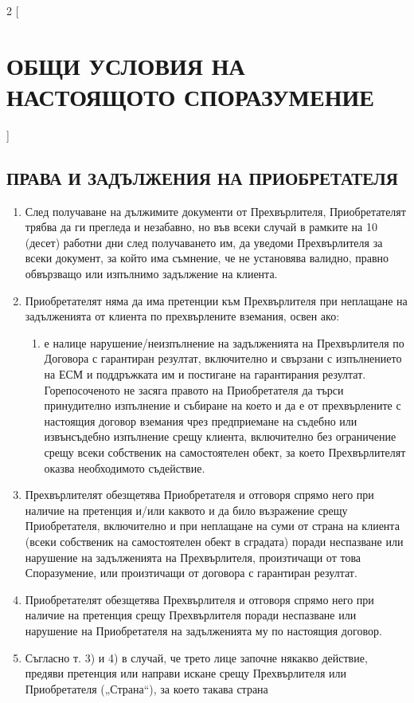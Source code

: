 \begin{multicols}{2} [\section{ОБЩИ УСЛОВИЯ НА НАСТОЯЩОТО
    СПОРАЗУМЕНИЕ}]
  \subsection{ПРАВА И ЗАДЪЛЖЕНИЯ НА ПРИОБРЕТАТЕЛЯ}
  \begin{enumerate}
  \item След получаване на дължимите документи от Прехвърлителя,
    Приобретателят трябва да ги прегледа и незабавно, но във всеки
    случай в рамките на 10 (десет) работни дни след получаването им,
    да уведоми Прехвърлителя за всеки документ, за който има съмнение,
    че не установява валидно, правно обвързващо или изпълнимо
    задължение на клиента.
  \item Приобретателят няма да има претенции към Прехвърлителя при
    неплащане на задълженията от клиента по прехвърлените вземания,
    освен ако:
    \begin{enumerate}
    \item е налице нарушение/неизпълнение на задълженията на
      Прехвърлителя по Договора с гарантиран резултат, включително и
      свързани с изпълнението на ЕСМ и поддръжката им и постигане на
      гарантирания резултат. Горепосоченото не засяга правото на
      Приобретателя да търси принудително изпълнение и събиране на
      което и да е от прехвърлените с настоящия договор вземания чрез
      предприемане на съдебно или извънсъдебно изпълнение срещу
      клиента, включително без ограничение срещу всеки собственик на
      самостоятелен обект, за което Прехвърлителят оказва необходимото
      съдействие.
    \end{enumerate}
  \item Прехвърлителят обезщетява Приобретателя и отговоря спрямо него
    при наличие на претенция и/или каквото и да било възражение срещу
    Приобретателя, включително и при неплащане на суми от страна на
    клиента (всеки собственик на самостоятелен обект в сградата)
    поради неспазване или нарушение на задълженията на Прехвърлителя,
    произтичащи от това Споразумение, или произтичащи от договора с
    гарантиран резултат.
  \item Приобретателят обезщетява Прехвърлителя и отговоря спрямо него
    при наличие на претенция срещу Прехвърлителя поради неспазване или
    нарушение на Приобретателя на задълженията му по настоящия
    договор.
  \item Съгласно т. 3) и 4) в случай, че трето лице започне някакво
    действие, предяви претенция или направи искане срещу Прехвърлителя
    или Приобретателя („Страна“), за което такава страна

\end{enumerate}
\end{multicols}
